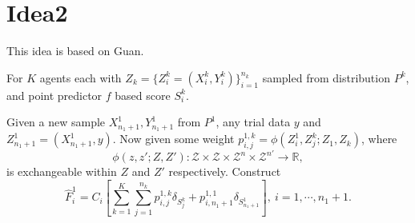 \documentclass[12pt, a4paper, oneside]{article}
\begin{document}
\newpage
\section{Idea2}
    This idea is based on Guan\cite{guan2023localized}.


    For $K$ agents each with $Z_k=\{Z_i^k=(X_i^k,Y_i^k)\}_{i=1}^{n_k}$ sampled from distribution $P^k$, and point predictor $f$ based score $S_i^k$.

    
    Given a new sample $X_{n_1+1}^1,Y_{n_1+1}^1$ from $P^1$, any trial data $y$ and $Z_{n_1+1}^1=(X_{n_1+1}^1,y)$. Now given some weight $p_{i,j}^{1,k}=\phi(Z_i^1,Z_j^k;Z_1,Z_k)$, where
    \begin{equation*}
        \phi(z,z';Z,Z'):\mathcal{Z}\times\mathcal{Z}\times\mathcal{Z}^{n}\times\mathcal{Z}^{n'}\rightarrow\mathbb{R},
    \end{equation*}
    is exchangeable within $Z$ and $Z'$ respectively. Construct
    \begin{equation*}
        \hat{F}_i^1=C_i\left[ \overset{K}{\underset{k=1}\sum}\overset{n_k}{\underset{j=1}\sum}p_{i,j}^{1,k}\delta_{S_j^k}+p_{i,n_1+1}^{1,1}\delta_{S_{n_1+1}^1} \right],\ i=1,\cdots,n_1+1.
    \end{equation*}
\end{document}
